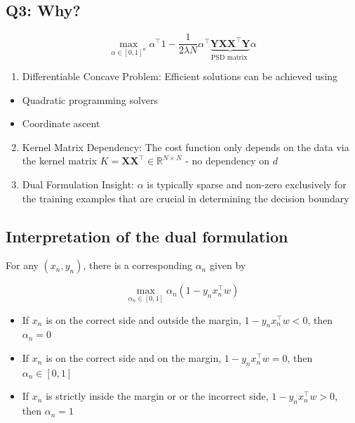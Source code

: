 \subsection*{Q3: Why?}
$$
\max _{\alpha \in[0,1]^{n}} \alpha^{\top} 1-\frac{1}{2 \lambda N} \alpha^{\top} \underbrace{\mathbf{Y X} \mathbf{X}^{\top} \mathbf{Y}}_{\text {PSD matrix }} \alpha
$$

\begin{enumerate}
  \item Differentiable Concave Problem: Efficient solutions can be achieved using
\end{enumerate}

\begin{itemize}
  \item Quadratic programming solvers
  \item Coordinate ascent
\end{itemize}

\begin{enumerate}
  \setcounter{enumi}{1}
  \item Kernel Matrix Dependency: The cost function only depends on the data via the kernel matrix $K=\mathbf{X} \mathbf{X}^{\top} \in \mathbb{R}^{N \times N}$ - no dependency on $d$

  \item Dual Formulation Insight: $\alpha$ is typically sparse and non-zero exclusively for the training examples that are crucial in determining the decision boundary

\end{enumerate}

\subsection*{Interpretation of the dual formulation}
For any $\left(x_{n}, y_{n}\right)$, there is a corresponding $\alpha_{n}$ given by

$$
\max _{\alpha_{n} \in[0,1]} \alpha_{n}\left(1-y_{n} x_{n}^{\top} w\right)
$$

\begin{itemize}
  \item If $x_{n}$ is on the correct side and outside the margin, $1-y_{n} x_{n}^{\top} w<0$, then $\alpha_{n}=0$
  \item If $x_{n}$ is on the correct side and on the margin, $1-y_{n} x_{n}^{\top} w=0$, then $\alpha_{n} \in[0,1]$
  \item If $x_{n}$ is strictly inside the margin or or the incorrect side, $1-y_{n} x_{n}^{\top} w>0$, then $\alpha_{n}=1$
\end{itemize}


